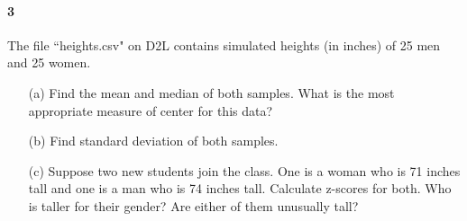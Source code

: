 \documentclass{article}
\begin{document}
\begin{flushleft}
\paragraph{3} The file ``heights.csv" on D2L contains simulated heights (in inches) of 25 men and 25 women. 
\begin{itemize}
\item [(a)] Find the mean and median of both samples. What is the most appropriate measure of center for this data?
\vspace{2.25in}
\item[(b)] Find standard deviation of both samples.
\vspace{2.25in}
\item[(c)] Suppose two new students join the class. One is a woman who is 71 inches tall and one is a man who is 74 inches tall. Calculate z-scores for both. Who is taller for their gender? Are either of them unusually tall?
\end{itemize}


\end{flushleft}
\end{document}
